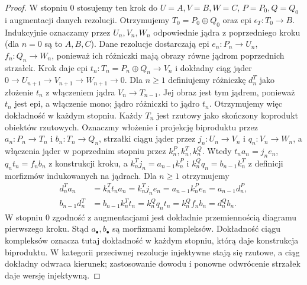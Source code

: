 \begin{proof}
W stopniu $0$ stosujemy ten krok do $U=A,V=B,W=C$, $P=P_0,Q=Q_0$ i augmentacji danych rezolucji. Otrzymujemy $T_0=P_0\oplus Q_0$ oraz epi $\epsilon_T:T_0\to B$. Indukcyjnie oznaczamy przez $U_n,V_n,W_n$ odpowiednie jądra z poprzedniego kroku (dla $n=0$ są to $A,B,C$). Dane rezolucje dostarczają epi $e_n:P_n\to U_n$, $f_n:Q_n\to W_n$, ponieważ ich różniczki mają obrazy równe jądrom poprzednich strzałek. Krok daje epi $t_n:T_n=P_n\oplus Q_n\to V_n$ i dokładny ciąg jąder $0\to U_{n+1}\to V_{n+1}\to W_{n+1}\to0$. Dla $n\ge1$ definiujemy różniczkę $d_n^T$ jako złożenie $t_n$ z włączeniem jądra $V_n\to T_{n-1}$. Jej obraz jest tym jądrem, ponieważ $t_n$ jest epi, a włączenie mono; jądro różniczki to jądro $t_n$. Otrzymujemy więc dokładność w każdym stopniu. Każdy $T_n$ jest rzutowy jako skończony koprodukt obiektów rzutowych.
Oznaczmy włożenie i projekcję biproduktu przez $a_n:P_n\to T_n$ i $b_n:T_n\to Q_n$, strzałki ciągu jąder przez $j_n:U_n\to V_n$ i $q_n:V_n\to W_n$, a włączenia jąder w poprzednim stopniu przez $k_n^P,k_n^T,k_n^Q$. Wtedy $t_na_n=j_ne_n$, $q_nt_n=f_nb_n$ z konstrukcji kroku, a $k_n^Tj_n=a_{n-1}k_n^P$ i $k_n^Qq_n=b_{n-1}k_n^T$ z definicji morfizmów indukowanych na jądrach. Dla $n\ge1$ otrzymujemy
\[
\begin{aligned}
d_n^Ta_n&=k_n^Tt_na_n=k_n^Tj_ne_n
=a_{n-1}k_n^Pe_n=a_{n-1}d_n^P,\\
b_{n-1}d_n^T&=b_{n-1}k_n^Tt_n=k_n^Qq_nt_n
=k_n^Qf_nb_n=d_n^Qb_n.
\end{aligned}
\]
W stopniu $0$ zgodność z augmentacjami jest dokładnie przemiennością diagramu pierwszego kroku. Stąd $a_\bullet,b_\bullet$ są morfizmami kompleksów. Dokładność ciągu kompleksów oznacza tutaj dokładność w każdym stopniu, którą daje konstrukcja biproduktu.
W kategorii przeciwnej rezolucje injektywne stają się rzutowe, a ciąg dokładny odwraca kierunek; zastosowanie dowodu i ponowne odwrócenie strzałek daje wersję injektywną.
\end{proof}

